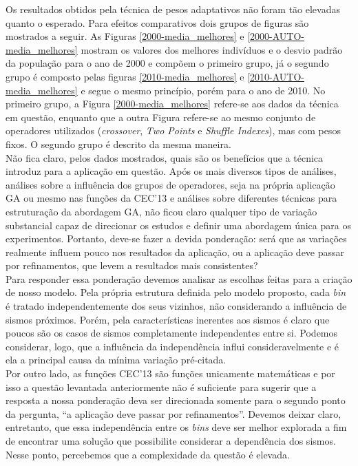 Os resultados obtidos pela técnica de pesos adaptativos não foram tão elevadas quanto o esperado. Para efeitos comparativos dois grupos de figuras são mostrados a seguir. As Figuras \ref{2000-media_melhores} e \ref{2000-AUTO-media_melhores} mostram os valores dos melhores indivíduos e o desvio padrão da população para o ano de 2000 e compõem o primeiro grupo, já o segundo grupo é composto pelas figuras \ref{2010-media_melhores} e \ref{2010-AUTO-media_melhores} e segue o mesmo princípio, porém para o ano de 2010. No primeiro grupo, a Figura \ref{2000-media_melhores} refere-se aos dados da técnica em questão, enquanto que a outra Figura refere-se ao mesmo conjunto de operadores utilizados ({\it crossover}, {\it Two Points} e {\it Shuffle Indexes}), mas com pesos fixos. O segundo grupo é descrito da mesma maneira.\\

Não fica claro, pelos dados mostrados, quais são os benefícios que a técnica introduz para a aplicação em questão. Após os mais diversos tipos de análises, análises sobre a influência dos grupos de operadores, seja na própria aplicação GA ou mesmo nas funções da CEC'13 e análises sobre diferentes técnicas para estruturação da abordagem GA, não ficou claro qualquer tipo de variação substancial capaz de direcionar os estudos e definir uma abordagem única para os experimentos. Portanto, deve-se fazer a devida ponderação: será que as variações realmente influem pouco nos resultados da aplicação, ou a aplicação deve passar por refinamentos, que levem a resultados mais consistentes?\\

Para responder essa ponderação devemos analisar as escolhas feitas para a criação de nosso modelo. Pela própria estrutura definida pelo modelo proposto, cada {\it bin} é tratado independentemente dos seus vizinhos, não considerando a influência de sismos próximos. Porém, pela características inerentes aos sismos é claro que poucos são os casos de sismos completamente independentes entre si. Podemos considerar, logo, que a influência da independência influi consideravelmente e é ela a principal causa da mínima variação pré-citada. \\

Por outro lado, as funções CEC'13 são funções unicamente matemáticas e por isso a questão levantada anteriormente não é suficiente para sugerir que a resposta a nossa ponderação deva ser direcionada somente para o segundo ponto da pergunta, ``a aplicação deve passar por refinamentos''. Devemos deixar claro, entretanto, que essa independência entre os {\it bins} deve ser melhor explorada a fim de encontrar uma solução que possibilite considerar a dependência dos sismos. Nesse ponto, percebemos que a complexidade da questão é elevada. \\ 

